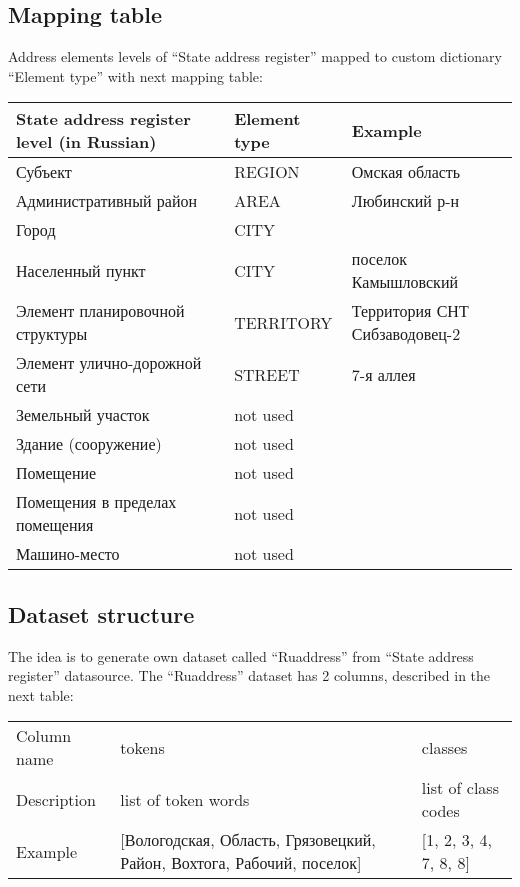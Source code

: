 \documentclass{article}
\begin{document}
\subsection{Mapping table}
Address elements levels of ``State address register'' mapped to custom dictionary ``Element type'' with next mapping table:


\begin{center}
    \begin{tabular}{| l | l | l | }
        \hline
        State address register level (in Russian) & Element type & Example  \\
        \hline
        Субъект & REGION & Омская область  \\
        Административный район & AREA & Любинский р-н   \\
        Город & CITY &    \\
        Населенный пункт & CITY &  поселок Камышловский \\
        Элемент планировочной структуры & TERRITORY & Территория СНТ Сибзаводовец-2  \\
        Элемент улично-дорожной сети & STREET & 7-я аллея \\
        Земельный участок & not used & \\
        Здание (сооружение) & not used &  \\
        Помещение & not used & \\
        Помещения в пределах помещения & not used  &\\
        Машино-место & not used  &\\
        \hline
    \end{tabular}
\end{center}

\subsection{Dataset structure}

The idea is to generate own dataset called ``Ruaddress'' from ``State address register'' datasource.
The ``Ruaddress'' dataset has 2 columns, described in the next table:

\begin{center}
    \begin{tabular}{| l | p{6cm} | l | }
        \hline
        Column name & tokens & classes  \\
        Description & list of token words & list of class codes  \\
        Example & [Вологодская, Область, Грязовецкий, Район, Вохтога, Рабочий, поселок] &  [1, 2, 3, 4, 7, 8, 8] \\
        \hline
    \end{tabular}
\end{center}
\end{document}
